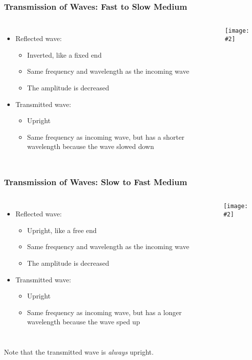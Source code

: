 \documentclass[12pt,aspectratio=169]{beamer}
\newcommand{\pic}[2]{\texttt{[image: \#2]}}
\begin{document}
\begin{frame}
  \frametitle{Transmission of Waves: Fast to Slow Medium}
  \begin{columns}
    \begin{itemize}
    \item Reflected wave:
      \begin{itemize}
      \item Inverted, like a fixed end
      \item Same frequency and wavelength as the incoming wave
      \item The amplitude is decreased
      \end{itemize}
    \item Transmitted wave:
      \begin{itemize}
      \item Upright
      \item Same frequency as incoming wave, but has a shorter wavelength
        because the wave slowed down
      \end{itemize}
    \end{itemize}
    
    \pic{1}{23.jpg}
  \end{columns}
\end{frame}


\begin{frame}
  \frametitle{Transmission of Waves: Slow to Fast Medium}
  \begin{columns}
    \begin{itemize}
    \item Reflected wave:
      \begin{itemize}
      \item Upright, like a free end
      \item Same frequency and wavelength as the incoming wave
      \item The amplitude is decreased
      \end{itemize}
    \item Transmitted wave:
      \begin{itemize}
      \item Upright
      \item Same frequency as incoming wave, but has a longer wavelength because
        the wave sped up
      \end{itemize}
    \end{itemize}
    
    \pic{1}{24.jpg}
  \end{columns}
  Note that the transmitted wave is \emph{always} upright.
\end{frame}
\end{document}
